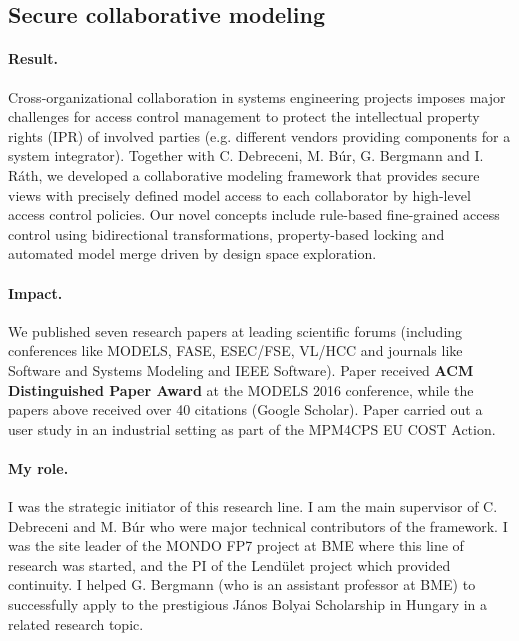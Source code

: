 \subsection{Secure collaborative modeling}
\paragraph{Result.} 
Cross-organizational collaboration in systems engineering projects imposes major challenges for access control management to protect the intellectual property rights (IPR) of involved parties (e.g. different vendors providing components for a system integrator). Together with C. Debreceni, M. Búr, G. Bergmann and I. Ráth, we developed a collaborative modeling framework that provides secure views with precisely defined model access to each collaborator by high-level access control policies. Our novel concepts include rule-based fine-grained access control using bidirectional transformations, property-based locking and automated model merge driven by design space exploration.

\paragraph{Impact.} 
We published seven research papers \cite{fase2016-merge,MODELS2016-access,models2017,esec-fse2017,vlhcc2018,sosym2017-mondo,ieeesw2018} at leading scientific forums (including conferences like MODELS, FASE, ESEC/FSE, VL/HCC and journals like Software and Systems Modeling and IEEE Software). Paper \cite{MODELS2016-access} received \textbf{ACM Distinguished Paper Award} at the MODELS 2016 conference, while the papers above received over 40 citations (Google Scholar). Paper \cite{vlhcc2018} carried out a user study in an industrial setting as part of the MPM4CPS EU COST Action.

\paragraph{My role.} 
I was the strategic initiator of this research line. I am the main supervisor of C. Debreceni and M. Búr who were major technical contributors of the framework. I was the site leader of the MONDO FP7 project at BME where this line of research was started, and the PI of the Lendület project which provided continuity. I helped G. Bergmann (who is an assistant professor at BME) to successfully apply to the prestigious János Bolyai Scholarship in Hungary in a related research topic. 



